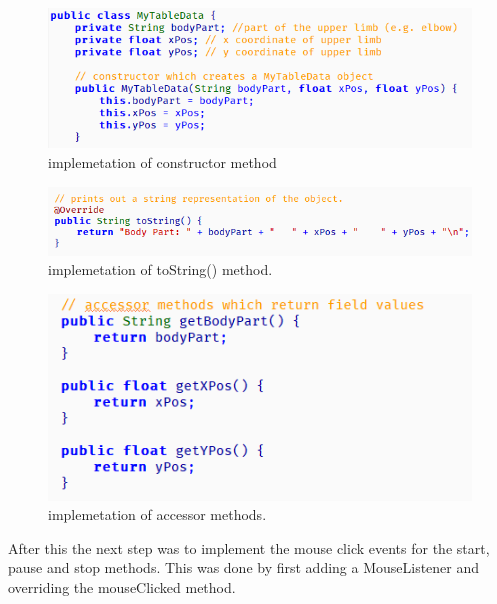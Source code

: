 \documentclass[a4paper, 12pt]{article}
\begin{document}
\begin{figure}[!htb]
	\begin{center}
  \includegraphics[scale=1.0]{codesnippet11.png}
  	\caption{implemetation of constructor method}
  \end{center} 
  \label{fig: codesnippet10} 
\end{figure}

\begin{figure}[!htb]
	\begin{center}
  \includegraphics[scale=0.9]{codesnippet13.png}
  	\caption{implemetation of toString() method.}
  \end{center} 
  \label{fig: codesnippet12} 
\end{figure}

\begin{figure}
	\begin{center}
  \includegraphics[scale=0.9]{codesnippet12.png}
  	\caption{implemetation of accessor methods.}
  \end{center} 
  \label{fig: codesnippet11} 
\end{figure}


After this the next step was to implement the mouse click events for the start, pause and stop methods. This was done by first adding a MouseListener and overriding the mouseClicked method. 
\end{document}
